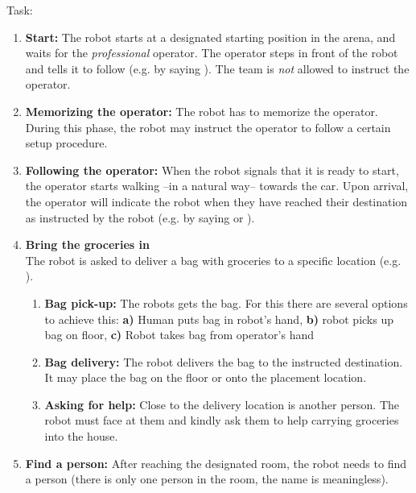 \documentclass[a4paper, twocolumn]{article}
\begin{document}
    Task:
    \begin{enumerate}
      \item \textbf{Start:} The robot starts at a designated starting position in the arena, and waits for the \textit{professional} operator. The operator steps in front of the robot and tells it to follow (e.g. by saying ). The team is \emph{not} allowed to instruct the operator.

      \item \textbf{Memorizing the operator:} The robot has to memorize the operator. During this phase, the robot may instruct the operator to follow a certain setup procedure.

      \item \textbf{Following the operator:} When the robot signals that it is ready to start, the operator starts walking --in a natural way-- towards the car. Upon arrival, the operator will indicate the robot when they have reached their destination as instructed by the robot (e.g. by saying  or ).

      \item \textbf{Bring the groceries in} \\
      The robot is asked to deliver a bag with groceries  to a specific location (e.g. ).
      \begin{enumerate}
        \item \textbf{Bag pick-up:} The robots gets the bag. For this there are several options to achieve this:
          \textbf{a)} Human puts bag in robot's hand,
          \textbf{b)} robot picks up bag on floor,
          \textbf{c)} Robot takes bag from operator's hand
        \item \textbf{Bag delivery:} The robot delivers the bag to the instructed destination. It may place the bag on the floor or onto the placement location.\\

        \item \textbf{Asking for help:} Close to the delivery location is another person. The robot must face at them and kindly ask them to help carrying groceries into the house.
      \end{enumerate}

        \item \textbf{Find a person:} After reaching the designated room, the robot needs to find a person (there is only one person in the room, the name is meaningless).
      \end{enumerate}
\end{document}
